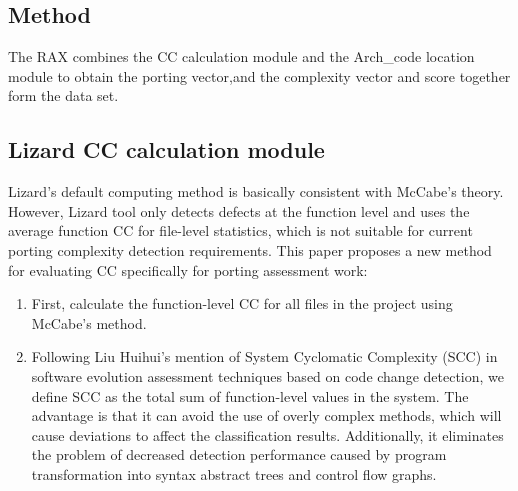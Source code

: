 \documentclass[sigconf,screen,review,anonymous]{acmart}
\begin{document}
\subsection{Method}
The RAX combines the CC calculation module and the Arch\_code location module to obtain the porting vector,and the complexity vector and score together form the data set.

\subsection{Lizard CC calculation module}
Lizard's default computing method is basically consistent with McCabe's theory.
However, Lizard tool only detects defects at the function level and uses the average function CC for file-level statistics, which is not suitable for current porting complexity detection requirements.
This paper proposes a new method for evaluating CC specifically for porting assessment work:
\begin{enumerate}
  \item First, calculate the function-level CC for all files in the project using McCabe's method.
  \item Following Liu Huihui's mention of System Cyclomatic Complexity (SCC) in software evolution assessment techniques based on code change detection, we define SCC as the total sum of function-level values in the system.
  The advantage is that it can avoid the use of overly complex methods, which will cause deviations to affect the classification results.
  Additionally, it eliminates the problem of decreased detection performance caused by program transformation into syntax abstract trees and control flow graphs.
\end{enumerate}
\end{document}
